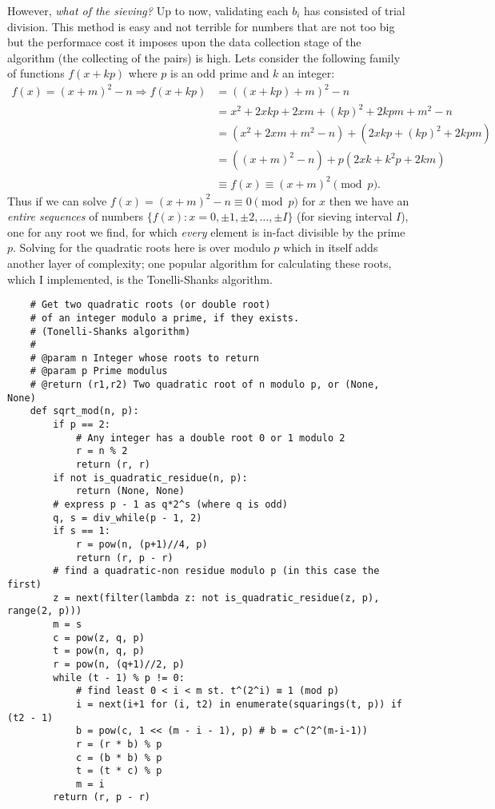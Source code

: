 \documentclass{report}
\begin{document}
However, \emph{what of the sieving?}
Up to now, validating each $b_i$ has consisted of trial division.
This method is easy and not terrible for numbers that are not too big but the performace cost it
imposes upon the data collection stage of the algorithm (the collecting of the pairs) is high.
Lets consider the following family of functions $f(x+kp)$ where $p$ is an odd prime and $k$ an
integer:
\begin{equation}
    \begin{aligned}
        f(x)=(x+m)^2-n \Rightarrow
        f(x+kp)
        &= ((x+kp)+m)^2 - n \\
        &= x^2+2xkp+2xm+(kp)^2+2kpm+m^2-n \\
        &= (x^2+2xm+m^2-n) + (2xkp+(kp)^2+2kpm) \\
        &= ((x+m)^2-n)+p(2xk+k^2 p+2km) \\
        &\equiv f(x) \equiv (x+m)^2 \pmod{p}.
    \end{aligned}
\end{equation}
Thus if we can solve $f(x) = (x+m)^2-n \equiv 0\pmod p$ for $x$ then we have an \emph{entire
sequences} of numbers $\{f(x):x=0,\pm 1,\pm 2,\ldots,\pm I\}$ (for sieving interval $I$), one
for any root we find, for which \emph{every} element is in-fact divisible by the prime $p$.
Solving for the quadratic roots here is over modulo $p$ which in itself adds another layer of
complexity; one popular algorithm for calculating these roots, which I implemented, is the
Tonelli-Shanks algorithm.
\begin{verbatim}
    # Get two quadratic roots (or double root)
    # of an integer modulo a prime, if they exists.
    # (Tonelli-Shanks algorithm)
    #
    # @param n Integer whose roots to return
    # @param p Prime modulus
    # @return (r1,r2) Two quadratic root of n modulo p, or (None, None)
    def sqrt_mod(n, p):
        if p == 2:
            # Any integer has a double root 0 or 1 modulo 2
            r = n % 2
            return (r, r)
        if not is_quadratic_residue(n, p):
            return (None, None)
        # express p - 1 as q*2^s (where q is odd)
        q, s = div_while(p - 1, 2)
        if s == 1:
            r = pow(n, (p+1)//4, p)
            return (r, p - r)
        # find a quadratic-non residue modulo p (in this case the first)
        z = next(filter(lambda z: not is_quadratic_residue(z, p), range(2, p)))
        m = s
        c = pow(z, q, p)
        t = pow(n, q, p)
        r = pow(n, (q+1)//2, p)
        while (t - 1) % p != 0:
            # find least 0 < i < m st. t^(2^i) ≡ 1 (mod p)
            i = next(i+1 for (i, t2) in enumerate(squarings(t, p)) if (t2 - 1)
            b = pow(c, 1 << (m - i - 1), p) # b = c^(2^(m-i-1))
            r = (r * b) % p
            c = (b * b) % p
            t = (t * c) % p
            m = i
        return (r, p - r)
\end{verbatim}
\end{document}
